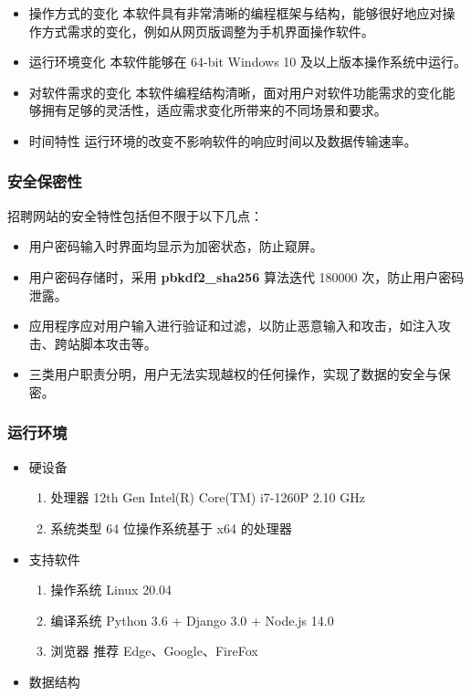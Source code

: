 \documentclass[UTF8,a4paper,10pt]{ctexart}
\begin{document}
\begin{itemize}
    \item 操作方式的变化 本软件具有非常清晰的编程框架与结构，能够很好地应对操作方式需求的变化，例如从网页版调整为手机界面操作软件。
    \item 运行环境变化 本软件能够在 64-bit Windows 10 及以上版本操作系统中运行。
    \item 对软件需求的变化 本软件编程结构清晰，面对用户对软件功能需求的变化能够拥有足够的灵活性，适应需求变化所带来的不同场景和要求。
    \item 时间特性 运行环境的改变不影响软件的响应时间以及数据传输速率。
\end{itemize}

\subsubsection{安全保密性}

招聘网站的安全特性包括但不限于以下几点：
\begin{itemize}
    \item 用户密码输入时界面均显示为加密状态，防止窥屏。
    \item 用户密码存储时，采用 \textbf{pbkdf2\_sha256} 算法迭代 180000 次，防止用户密码泄露。
    \item 应用程序应对用户输入进行验证和过滤，以防止恶意输入和攻击，如注入攻击、跨站脚本攻击等。
    \item 三类用户职责分明，用户无法实现越权的任何操作，实现了数据的安全与保密。
\end{itemize}

\subsubsection{运行环境}

\begin{itemize}
    \item 硬设备
    \begin{enumerate}[label=\arabic*.]
        \item 处理器 12th Gen Intel(R) Core(TM) i7-1260P 2.10 GHz
        \item 系统类型 64 位操作系统基于 x64 的处理器
    \end{enumerate}

    \item 支持软件
    \begin{enumerate}[label=\arabic*.]
        \item 操作系统 Linux 20.04
        \item 编译系统 Python 3.6 + Django 3.0 + Node.js 14.0
        \item 浏览器 推荐 Edge、Google、FireFox
    \end{enumerate}

    \item 数据结构  
\end{itemize}
\end{document}
